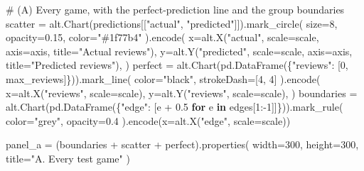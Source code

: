 \documentclass[
  letterpaper,
  DIV=11,
  numbers=noendperiod]{scrartcl}
\newenvironment{Shaded}{\begin{snugshade}}{\end{snugshade}}
\newcommand{\CommentTok}[1]{\textcolor[rgb]{0.37,0.37,0.37}{#1}}
\newcommand{\ControlFlowTok}[1]{\textcolor[rgb]{0.00,0.23,0.31}{\textbf{#1}}}
\newcommand{\DecValTok}[1]{\textcolor[rgb]{0.68,0.00,0.00}{#1}}
\newcommand{\FloatTok}[1]{\textcolor[rgb]{0.68,0.00,0.00}{#1}}
\newcommand{\KeywordTok}[1]{\textcolor[rgb]{0.00,0.23,0.31}{\textbf{#1}}}
\newcommand{\NormalTok}[1]{\textcolor[rgb]{0.00,0.23,0.31}{#1}}
\newcommand{\OperatorTok}[1]{\textcolor[rgb]{0.37,0.37,0.37}{#1}}
\newcommand{\StringTok}[1]{\textcolor[rgb]{0.13,0.47,0.30}{#1}}
\begin{document}
\begin{Shaded}
\begin{Highlighting}[]
\CommentTok{\# (A) Every game, with the perfect{-}prediction line and the group boundaries}
\NormalTok{scatter }\OperatorTok{=}\NormalTok{ alt.Chart(predictions[[}\StringTok{"actual"}\NormalTok{, }\StringTok{"predicted"}\NormalTok{]]).mark\_circle(}
\NormalTok{    size}\OperatorTok{=}\DecValTok{8}\NormalTok{, opacity}\OperatorTok{=}\FloatTok{0.15}\NormalTok{, color}\OperatorTok{=}\StringTok{"\#1f77b4"}
\NormalTok{).encode(}
\NormalTok{    x}\OperatorTok{=}\NormalTok{alt.X(}\StringTok{"actual"}\NormalTok{, scale}\OperatorTok{=}\NormalTok{scale, axis}\OperatorTok{=}\NormalTok{axis, title}\OperatorTok{=}\StringTok{"Actual reviews"}\NormalTok{),}
\NormalTok{    y}\OperatorTok{=}\NormalTok{alt.Y(}\StringTok{"predicted"}\NormalTok{, scale}\OperatorTok{=}\NormalTok{scale, axis}\OperatorTok{=}\NormalTok{axis, title}\OperatorTok{=}\StringTok{"Predicted reviews"}\NormalTok{),}
\NormalTok{)}
\NormalTok{perfect }\OperatorTok{=}\NormalTok{ alt.Chart(pd.DataFrame(\{}\StringTok{"reviews"}\NormalTok{: [}\DecValTok{0}\NormalTok{, max\_reviews]\})).mark\_line(}
\NormalTok{    color}\OperatorTok{=}\StringTok{"black"}\NormalTok{, strokeDash}\OperatorTok{=}\NormalTok{[}\DecValTok{4}\NormalTok{, }\DecValTok{4}\NormalTok{]}
\NormalTok{).encode(}
\NormalTok{    x}\OperatorTok{=}\NormalTok{alt.X(}\StringTok{"reviews"}\NormalTok{, scale}\OperatorTok{=}\NormalTok{scale),}
\NormalTok{    y}\OperatorTok{=}\NormalTok{alt.Y(}\StringTok{"reviews"}\NormalTok{, scale}\OperatorTok{=}\NormalTok{scale),}
\NormalTok{)}
\NormalTok{boundaries }\OperatorTok{=}\NormalTok{ alt.Chart(pd.DataFrame(\{}\StringTok{"edge"}\NormalTok{: [e }\OperatorTok{+} \FloatTok{0.5} \ControlFlowTok{for}\NormalTok{ e }\KeywordTok{in}\NormalTok{ edges[}\DecValTok{1}\NormalTok{:}\OperatorTok{{-}}\DecValTok{1}\NormalTok{]]\})).mark\_rule(}
\NormalTok{    color}\OperatorTok{=}\StringTok{"grey"}\NormalTok{, opacity}\OperatorTok{=}\FloatTok{0.4}
\NormalTok{).encode(x}\OperatorTok{=}\NormalTok{alt.X(}\StringTok{"edge"}\NormalTok{, scale}\OperatorTok{=}\NormalTok{scale))}

\NormalTok{panel\_a }\OperatorTok{=}\NormalTok{ (boundaries }\OperatorTok{+}\NormalTok{ scatter }\OperatorTok{+}\NormalTok{ perfect).properties(}
\NormalTok{    width}\OperatorTok{=}\DecValTok{300}\NormalTok{, height}\OperatorTok{=}\DecValTok{300}\NormalTok{, title}\OperatorTok{=}\StringTok{"A. Every test game"}
\NormalTok{)}


\end{Highlighting}
\end{Shaded}
\end{document}
